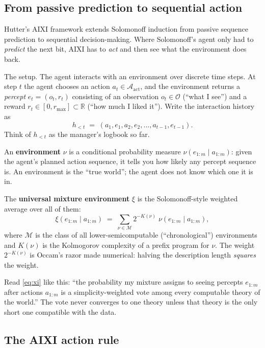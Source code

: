 \documentclass[12pt,a4paper]{article}
\theoremstyle{plain}
\theoremstyle{definition}
\begin{document}
\subsection*{From passive prediction to sequential action}

Hutter's AIXI framework \citep{hutter2005universal} extends Solomonoff
induction from passive sequence prediction to sequential
decision-making.  Where Solomonoff's agent only had to \emph{predict}
the next bit, AIXI has to \emph{act} and then see what the environment
does back.

The setup.  The agent interacts with an environment over discrete time
steps.  At step $t$ the agent chooses an action $a_t \in
\mathcal{A}_{\mathrm{act}}$, and the environment returns a
\emph{percept} $e_t = (o_t, r_t)$ consisting of an observation $o_t
\in \mathcal{O}$ (``what I see'') and a reward $r_t \in [0,
r_{\max}]\subset\mathbb{R}$ (``how much I liked it'').  Write the
interaction history as
\[
  h_{<t} \;=\; (a_1, e_1, a_2, e_2, \dots, a_{t-1}, e_{t-1}).
\]
Think of $h_{<t}$ as the manager's logbook so far.

An \textbf{environment} $\nu$ is a conditional probability measure
$\nu(e_{1:m}\mid a_{1:m})$: given the agent's planned action sequence,
it tells you how likely any percept sequence is.  An environment is
the ``true world''; the agent does not know which one it is in.

The \textbf{universal mixture environment} $\xi$ is the
Solomonoff-style weighted average over all of them:
\begin{equation}
  \xi(e_{1:m} \mid a_{1:m})
  \;=\; \sum_{\nu \in \mathcal{M}} 2^{-K(\nu)}\;\nu(e_{1:m} \mid a_{1:m}),
  \label{eq:xi}
\end{equation}
where $\mathcal{M}$ is the class of all lower-semicomputable
(``chronological'') environments and $K(\nu)$ is the Kolmogorov
complexity of a prefix program for $\nu$.  The weight $2^{-K(\nu)}$ is
Occam's razor made numerical: halving the description length
\emph{squares} the weight.

\begin{intuition}
Read \eqref{eq:xi} like this: ``the probability my mixture assigns to
seeing percepts $e_{1:m}$ after actions $a_{1:m}$ is a
simplicity-weighted vote among every computable theory of the world.''
The vote never converges to one theory unless that theory is the only
short one compatible with the data.
\end{intuition}

\subsection*{The AIXI action rule}
\end{document}

